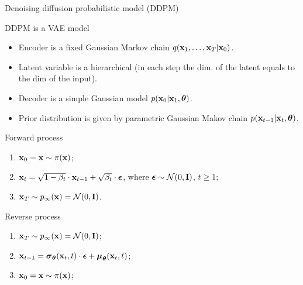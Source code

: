 \begin{frame}{Denoising diffusion probabilistic model (DDPM)}
	\begin{block}{DDPM is a VAE model}
		\begin{itemize}
			\item Encoder is a fixed Gaussian Markov chain $q(\mathbf{x}_1, \dots, \mathbf{x}_T | \mathbf{x}_0)$.
			\item Latent variable is a hierarchical (in each step the dim. of the latent equals to the dim of the input).
			\item Decoder is a simple Gaussian model $p(\mathbf{x}_0 | \mathbf{x}_1, \boldsymbol{\theta})$.
			\item Prior distribution is given by parametric Gaussian Makov chain $p(\mathbf{x}_{t-1} | \mathbf{x}_t, \boldsymbol{\theta})$.
		\end{itemize}
	\end{block}
	\begin{minipage}{0.5\linewidth}
		\begin{block}{Forward process}
			\begin{enumerate}
				\item $\mathbf{x}_0 = \mathbf{x} \sim \pi(\mathbf{x})$;
				\item $\mathbf{x}_t = \sqrt{1 - \beta_t} \cdot \mathbf{x}_{t - 1} + \sqrt{\beta_t} \cdot \boldsymbol{\epsilon}$, where $\boldsymbol{\epsilon} \sim \mathcal{N}(0, \mathbf{I})$, $t \geq 1$;
				\item $\mathbf{x}_T \sim p_{\infty}(\mathbf{x}) = \mathcal{N}(0, \mathbf{I})$.
			\end{enumerate}
		\end{block}
	\end{minipage}%
	\begin{minipage}{0.5\linewidth}
		\begin{block}{Reverse process}
			\begin{enumerate}
				\item $\mathbf{x}_T \sim p_{\infty}(\mathbf{x}) = \mathcal{N}(0, \mathbf{I})$;
				\item $\mathbf{x}_{t - 1} = \boldsymbol{\sigma}_{\boldsymbol{\theta}}(\mathbf{x}_t, t) \cdot \boldsymbol{\epsilon} + \boldsymbol{\mu}_{\boldsymbol{\theta}}(\mathbf{x}_t, t)$;
				\item $\mathbf{x}_0 = \mathbf{x} \sim \pi(\mathbf{x})$;
			\end{enumerate}
		\end{block}
	\end{minipage}
\end{frame}
